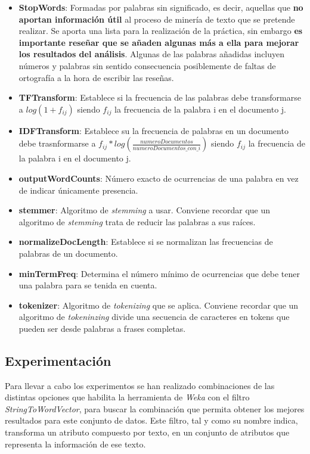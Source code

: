 \documentclass[12pt,a4paper, xcolor=table]{article}
\begin{document}
          \begin{itemize}
          \item \textbf{StopWords}: Formadas por palabras sin significado, es decir, aquellas que \textbf{no aportan información útil} al proceso de minería de texto que se pretende realizar. Se aporta una lista para la realización de la práctica, sin embargo \textbf{es importante reseñar que se añaden algunas más a ella para mejorar los resultados del análisis}. Algunas de las palabras añadidas incluyen números y palabras sin sentido consecuencia posiblemente de faltas de ortografía a la hora de escribir las reseñas.

          \item \textbf{TFTransform}: Establece si la frecuencia de las palabras debe transformarse a $log(1+f_{ij})$ siendo $f_{ij}$ la frecuencia de la palabra i en el documento j.
          \item \textbf{IDFTransform}: Establece su la frecuencia de palabras en un documento debe trasnformarse a $f_{ij} * log(\frac{numeroDocumentos}{numeroDocumentos\_con\_i})$ siendo $f_{ij}$ la frecuencia de la palabra i en el documento j.
          \item \textbf{outputWordCounts}: Número exacto de ocurrencias de una palabra en vez de indicar únicamente presencia.
          \item \textbf{stemmer}: Algoritmo de \textit{stemming} a usar. Conviene recordar que un algoritmo de \textit{stemming} trata de reducir las palabras a sus raíces.
          \item \textbf{normalizeDocLength}: Establece si se normalizan las frecuencias de palabras de un documento.
          \item \textbf{minTermFreq}: Determina el número mínimo de ocurrencias que debe tener una palabra para se tenida en cuenta.
          \item \textbf{tokenizer}: Algoritmo de \textit{tokenizing} que se aplica. Conviene recordar que un algoritmo de \textit{tokeninzing} divide una secuencia de caracteres en tokens que pueden ser desde palabras a frases completas.

          \end{itemize}

      \subsection{Experimentación}
        Para llevar a cabo los experimentos se han realizado combinaciones de las distintas opciones que habilita la herramienta de \textit{Weka} con el filtro \textit{StringToWordVector}, para buscar la combinación que permita obtener los mejores resultados para este conjunto de datos. Este filtro, tal y como su nombre indica, transforma un atributo compuesto por texto, en un conjunto de atributos que representa la información de ese texto.
\end{document}
